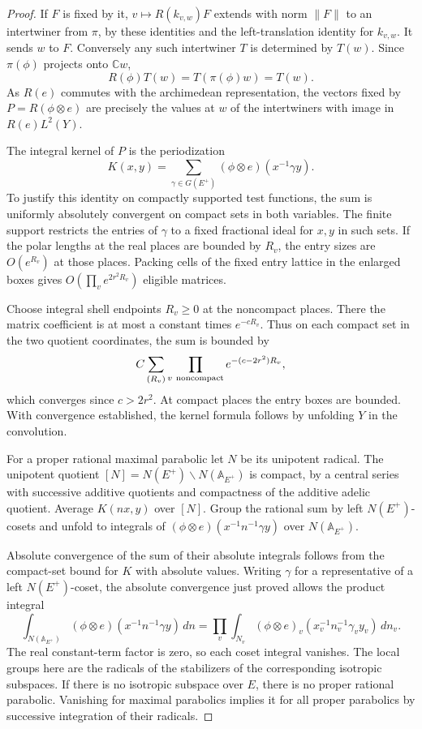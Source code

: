 \begin{proof}
If \(F\) is
fixed by it, \(v\mapsto R(k_{v,w})F\) extends with norm
\(\|F\|\) to an intertwiner from \(\pi\), by these identities
and the left-translation identity for \(k_{v,w}\). It sends
\(w\) to \(F\). Conversely any such intertwiner \(T\) is determined by \(T(w)\).
Since \(\pi(\phi)\) projects onto \(\mathbb C w\),
\[
                     R(\phi)T(w)=T(\pi(\phi)w)=T(w).
\]
As \(R(e)\) commutes with the archimedean representation,
the vectors fixed by \(P=R(\phi\otimes e)\) are precisely the
values at \(w\) of the intertwiners with image in \(R(e)L^2(Y)\).

The integral kernel of \(P\) is the periodization
\[
   K(x,y)=\sum_{\gamma\in G(E^+)}
                     (\phi\otimes e)(x^{-1}\gamma y).
\]
To justify this identity on compactly supported test functions,
the sum is uniformly absolutely convergent on compact sets in
both variables. The finite support restricts the entries of
\(\gamma\) to a fixed fractional ideal for \(x,y\) in such
sets. If the polar lengths at the real places are bounded by
\(R_v\), the entry sizes are \(O(e^{R_v})\) at those places.
Packing cells of the fixed entry lattice in the enlarged
boxes gives \(O(\prod_v e^{2r^2R_v})\) eligible matrices.

Choose integral shell endpoints \(R_v\ge0\) at the
noncompact places. There the matrix coefficient is at most
a constant times \(e^{-cR_v}\). Thus on each compact set in
the two quotient coordinates, the sum is bounded by
\[
 C\sum_{(R_v)}\prod_{v\ {\rm noncompact}}e^{-(c-2r^2)R_v},
\]
which converges since \(c>2r^2\). At compact
places the entry boxes are bounded. With convergence established,
the kernel formula follows by unfolding \(Y\) in the convolution.

For a proper rational maximal parabolic let \(N\) be its
unipotent radical. The unipotent quotient
\([N]=N(E^+)\backslash N(\mathbb A_{E^+})\) is compact,
by a central series with successive additive quotients and
compactness of the additive adelic quotient. Average \(K(nx,y)\)
over \([N]\). Group the rational sum by left \(N(E^+)\)-cosets
and unfold to integrals of
\((\phi\otimes e)(x^{-1}n^{-1}\gamma y)\) over \(N(\mathbb A_{E^+})\).

Absolute convergence of the sum of their absolute integrals
follows from the compact-set bound for \(K\) with absolute values.
Writing \(\gamma\) for a representative of a left
\(N(E^+)\)-coset, the absolute convergence just proved allows
the product integral
\[
 \int_{N(\mathbb A_{E^+})}(\phi\otimes e)(x^{-1}n^{-1}\gamma y)\,dn
   =\prod_v\int_{N_v}(\phi\otimes e)_v(x_v^{-1}n_v^{-1}\gamma_v y_v)\,dn_v .
\]
The real constant-term factor is zero, so each coset integral
vanishes. The local groups here are the radicals of the
stabilizers of the corresponding isotropic subspaces. If there
is no isotropic subspace over \(E\), there is no proper rational
parabolic. Vanishing for maximal parabolics implies it for all
proper parabolics by successive integration of their radicals.


\end{proof}
